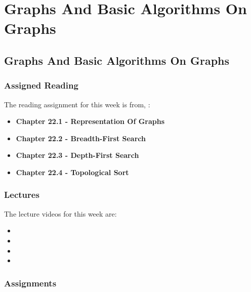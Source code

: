 \clearpage

\renewcommand{\ChapTitle}{Graphs And Basic Algorithms On Graphs}
\renewcommand{\SectionTitle}{Graphs And Basic Algorithms On Graphs}

\chapter{\ChapTitle}
\section{\SectionTitle}

\subsection{Assigned Reading}

The reading assignment for this week is from, \Textbook:

\begin{itemize}
    \item \textbf{Chapter 22.1 - Representation Of Graphs}
    \item \textbf{Chapter 22.2 - Breadth-First Search}
    \item \textbf{Chapter 22.3 - Depth-First Search}
    \item \textbf{Chapter 22.4 - Topological Sort}
\end{itemize}

\subsection{Lectures}

The lecture videos for this week are:

\begin{itemize}
    \item {}
    \item {}
    \item {}
    \item {}
\end{itemize}

\subsection{Assignments}

